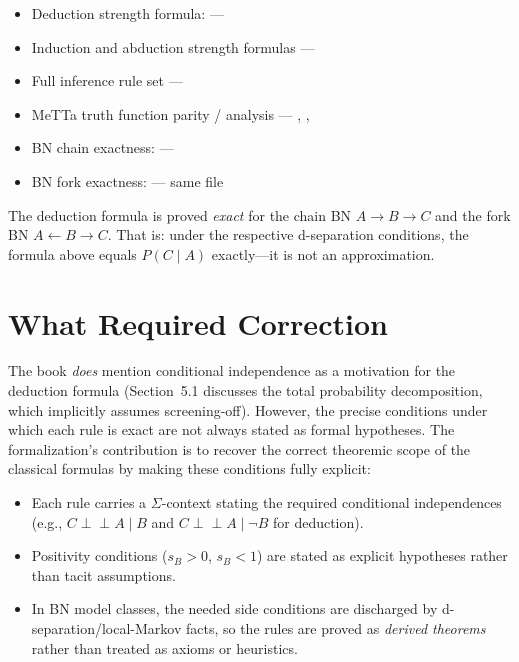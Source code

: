 \documentclass[11pt,openany]{report}
\begin{document}
\begin{itemize}
\item Deduction strength formula:  ---
\item Induction and abduction strength formulas ---
\item Full inference rule set ---
\item MeTTa truth function parity / analysis ---
  ,
  ,
\item BN chain exactness:  ---
\item BN fork exactness:  ---
  same file
\end{itemize}

The deduction formula is proved \emph{exact} for the chain BN
$A \to B \to C$ and the fork BN $A \leftarrow B \to C$.  That is:
under the respective d-separation conditions, the formula above equals
$P(C \mid A)$ exactly---it is not an approximation.

\section{What Required Correction}

The book \emph{does} mention conditional independence as a motivation
for the deduction formula (Section~5.1 discusses the total probability
decomposition, which implicitly assumes screening-off).  However, the
precise conditions under which each rule is exact are not always stated
as formal hypotheses.  The formalization's contribution is to recover
the correct theoremic scope of the classical formulas by making these
conditions fully explicit:

\begin{itemize}
\item Each rule carries a $\Sigma$-context stating the required
  conditional independences (e.g., $C \perp\!\!\!\perp A \mid B$ and
  $C \perp\!\!\!\perp A \mid \lnot B$ for deduction).
\item Positivity conditions ($s_B > 0$, $s_B < 1$) are stated as
  explicit hypotheses rather than tacit assumptions.
\item In BN model classes, the needed side conditions are discharged by
  d-separation/local-Markov facts, so the rules are proved as
  \emph{derived theorems} rather than treated as axioms or heuristics.
\end{itemize}
\end{document}

